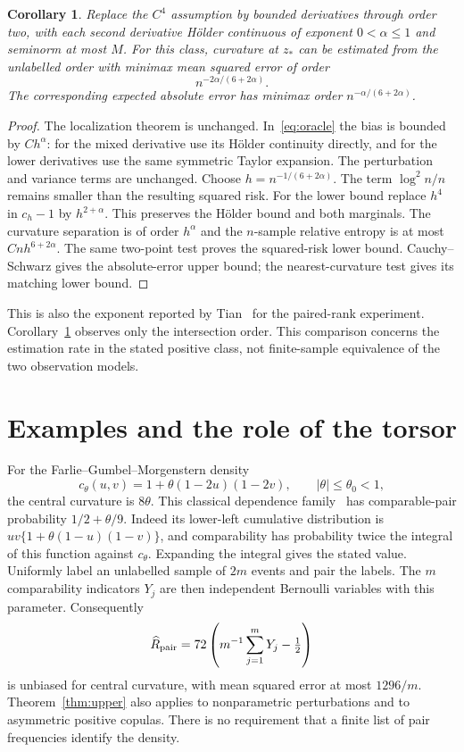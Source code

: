 \documentclass[11pt]{article}
\newtheorem{corollary}[theorem]{Corollary}
\theoremstyle{remark}
\numberwithin{equation}{section}
\begin{document}
\begin{corollary}\label{cor:holder}
Replace the $C^4$ assumption by bounded derivatives through order two,
with each second derivative H\"older continuous of exponent
$0<\alpha\le1$ and seminorm at most $M$.
For this class, curvature at $z_*$ can be estimated from the
unlabelled order with minimax mean squared error of order
\[
 n^{-2\alpha/(6+2\alpha)}.
\]
The corresponding expected absolute error has minimax order
$n^{-\alpha/(6+2\alpha)}$.
\end{corollary}
\begin{proof}
The localization theorem is unchanged.
In~\eqref{eq:oracle} the bias is bounded by $Ch^\alpha$:
for the mixed derivative use its H\"older continuity directly,
and for the lower derivatives use the same symmetric Taylor expansion.
The perturbation and variance terms are unchanged.
Choose $h=n^{-1/(6+2\alpha)}$.
The term $\log^2n/n$ remains smaller than the resulting squared risk.
For the lower bound replace $h^4$ in $c_h-1$ by $h^{2+\alpha}$.
This preserves the H\"older bound and both marginals.
The curvature separation is of order $h^\alpha$ and the $n$-sample
relative entropy is at most $Cn h^{6+2\alpha}$.
The same two-point test proves the squared-risk lower bound.
Cauchy--Schwarz gives the absolute-error upper bound; the
nearest-curvature test gives its matching lower bound.
\end{proof}

This is also the exponent reported by Tian~\cite{Tian} for the
paired-rank experiment. Corollary~\ref{cor:holder} observes only
the intersection order. This comparison concerns the estimation
rate in the stated positive class, not finite-sample equivalence
of the two observation models.

\section{Examples and the role of the torsor}
For the Farlie--Gumbel--Morgenstern density
\[
 c_\theta(u,v)=1+\theta(1-2u)(1-2v),\qquad |\theta|\le\theta_0<1,
\]
the central curvature is $8\theta$.
This classical dependence family~\cite{Farlie} has comparable-pair
probability $1/2+\theta/9$. Indeed its lower-left cumulative
distribution is $uv\{1+\theta(1-u)(1-v)\}$, and comparability has
probability twice the integral of this function against $c_\theta$.
Expanding the integral gives the stated value.
Uniformly label an unlabelled sample of $2m$ events and pair the labels.
The $m$ comparability indicators $Y_j$ are then independent Bernoulli
variables with this parameter. Consequently
\[
 \widehat R_{\rm pair}
     =72\left(m^{-1}\sum_{j=1}^mY_j-\tfrac12\right)
\]
is unbiased for central curvature, with mean squared error at most
$1296/m$. Theorem~\ref{thm:upper} also applies
to nonparametric perturbations and to asymmetric positive copulas.
There is no requirement that a finite list of pair frequencies
identify the density.
\end{document}
